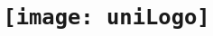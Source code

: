 \title{
	{\thesisTitle}\\
	{\large \institution}\\
	{\texttt{[image: uniLogo]} }
}
\author{\name}

\maketitle
